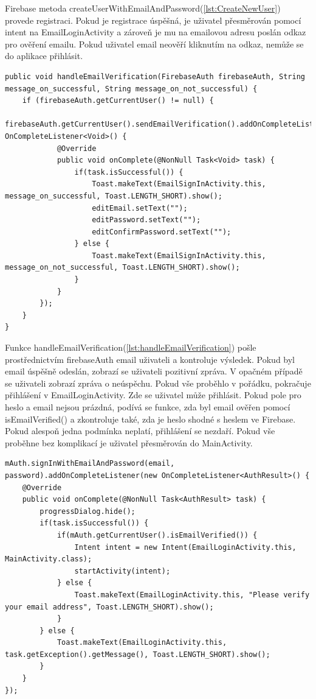 Firebase metoda createUserWithEmailAndPassword(\autoref{lst:CreateNewUser}) provede registraci. Pokud je registrace úspěšná, je uživatel přesměrován pomocí intent na EmailLoginActivity a zároveň je mu na emailovou adresu poslán odkaz pro ověření emailu. Pokud uživatel email neověří kliknutím na odkaz, nemůže se do aplikace přihlásit.

\begin{lstlisting}[style=javastyle,caption = {handleEmailVerification},label = {lst:handleEmailVerification}]
public void handleEmailVerification(FirebaseAuth firebaseAuth, String message_on_successful, String message_on_not_successful) {
    if (firebaseAuth.getCurrentUser() != null) {
        firebaseAuth.getCurrentUser().sendEmailVerification().addOnCompleteListener(new OnCompleteListener<Void>() {
            @Override
            public void onComplete(@NonNull Task<Void> task) {
                if(task.isSuccessful()) {
                    Toast.makeText(EmailSignInActivity.this, message_on_successful, Toast.LENGTH_SHORT).show();
                    editEmail.setText("");
                    editPassword.setText("");
                    editConfirmPassword.setText("");
                } else {
                    Toast.makeText(EmailSignInActivity.this, message_on_not_successful, Toast.LENGTH_SHORT).show();
                }
            }
        });
    }
}

\end{lstlisting}    

Funkce handleEmailVerification(\autoref{lst:handleEmailVerification}) pošle prostřednictvím firebaseAuth email uživateli a kontroluje výsledek. Pokud byl email úspěšně odeslán, zobrazí se uživateli pozitivní zpráva. V opačném případě se uživateli zobrazí zpráva o neúspěchu. Pokud vše proběhlo v pořádku, pokračuje přihlášení v EmailLoginActivity. Zde se uživatel může přihlásit. Pokud pole pro heslo a email nejsou prázdná, podívá se funkce, zda byl email ověřen pomocí isEmailVerified() a zkontroluje také, zda je heslo shodné s heslem ve Firebase. Pokud alespoň jedna podmínka neplatí, přihlášení se nezdaří. Pokud vše proběhne bez komplikací je uživatel přesměrován do MainActivity. \newpage

\begin{lstlisting}[style=javastyle,caption = {SignInWithEmailAndPassword},label = {lst:SignInWithEmailAndPassword}]
mAuth.signInWithEmailAndPassword(email, password).addOnCompleteListener(new OnCompleteListener<AuthResult>() {
    @Override
    public void onComplete(@NonNull Task<AuthResult> task) {
        progressDialog.hide();
        if(task.isSuccessful()) {
            if(mAuth.getCurrentUser().isEmailVerified()) {
                Intent intent = new Intent(EmailLoginActivity.this, MainActivity.class);
                startActivity(intent);
            } else {
                Toast.makeText(EmailLoginActivity.this, "Please verify your email address", Toast.LENGTH_SHORT).show();
            }
        } else {
            Toast.makeText(EmailLoginActivity.this, task.getException().getMessage(), Toast.LENGTH_SHORT).show();
        }
    }
});

\end{lstlisting}

